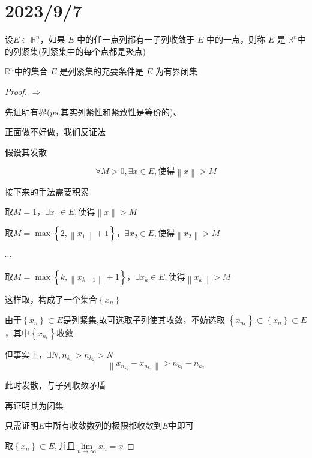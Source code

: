 \documentclass[lang=cn,10pt]{elegantbook}
\begin{document}
\section{2023/9/7}
\begin{definition}
	设$E\subset \mathbb{R} ^n$，如果 $E$ 中的任一点列都有一子列收敛于
	$E$ 中的一点，则称 $E$ 是 $\mathbb{R} ^n$中的列紧集(列紧集中的每个点都是聚点)
\end{definition}
\begin{theorem}
$\mathbb{R} ^n$中的集合 $E$
	是列紧集的充要条件是 $E$ 为有界闭集
\end{theorem}
\begin{proof}
	
	$\Rightarrow$
	
	先证明有界($ps.$其实列紧性和紧致性是等价的)、
	
	正面做不好做，我们反证法
	
	假设其发散
	
	\begin{equation*}
		\forall M>0,\exists x\in E,\text{使得}\left\| x \right\| >M
	\end{equation*}
	
	接下来的手法需要积累
	
	取$M=1$，$\exists x_{1}\in E,\text{使得}\left\| x \right\| >M$
	
	取$M=\max \left\{ 2,\left\| x_1 \right\| +1 \right\} $，$\exists x_{2}\in E,\text{使得}\left\| x_{2} \right\| >M$
	
	$\cdots$
	
	取$M=\max \left\{ k,\left\| x_{k-1} \right\| +1 \right\} $，$\exists x_{k}\in E,\text{使得}\left\| x_{k} \right\| >M$
	
	这样取，构成了一个集合$\left\{ x_n \right\} 
	$
	
	由于$\left\{ x_n \right\} 
	 \subset E$是列紧集,故可选取子列使其收敛，不妨选取
	 $\left\{ x_{n_{k}} \right\} 
	 \subset\left\{ x_n \right\} 
	 \subset E$，其中$\left\{ x_{n_{k}} \right\} $收敛
	 
	 但事实上，$\exists N,n_{k_{1}}> n_{k_{2}}>N$
	 \begin{equation*}
	 	\left\| x_{n_{k_1}}-x_{n_{k_2}} \right\| >n_{k_1}-n_{k_2}
	 \end{equation*}
	 
	 此时发散，与子列收敛矛盾
	 
	再证明其为闭集
	
	只需证明$E$中所有收敛数列的极限都收敛到$E$中即可
	
	$\text{取}\left\{ x_n \right\} \subset E,\text{并且}\underset{n\rightarrow \infty}{\lim}x_n=x$
	

\end{proof}
\end{document}
